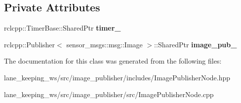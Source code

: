 \subsection*{Private Attributes}
\begin{DoxyCompactItemize}
\item 
\mbox{\label{classImagePublisherNode_a4346453ae3684b1898c4821de29dd19b}} 
rclcpp\+::\+Timer\+Base\+::\+Shared\+Ptr {\bfseries timer\+\_\+}
\item 
\mbox{\label{classImagePublisherNode_a290f9c65a7b80a16f239b7976a956fa8}} 
rclcpp\+::\+Publisher$<$ sensor\+\_\+msgs\+::msg\+::\+Image $>$\+::Shared\+Ptr {\bfseries image\+\_\+pub\+\_\+}
\end{DoxyCompactItemize}


The documentation for this class was generated from the following files\+:\begin{DoxyCompactItemize}
\item 
lane\+\_\+keeping\+\_\+ws/src/image\+\_\+publisher/includes/Image\+Publisher\+Node.\+hpp\item 
lane\+\_\+keeping\+\_\+ws/src/image\+\_\+publisher/src/Image\+Publisher\+Node.\+cpp\end{DoxyCompactItemize}
